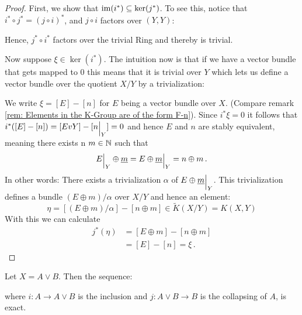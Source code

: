 \begin{proof}
	First, we show that $\mathrm{im}(i^*)\subseteq \ker(j^*)$. To see this, notice that $i^*\circ j^*=(j\circ i)^*$, and $j\circ i$ factors over $(Y,Y)$:
	\begin{center}
	\end{center} Hence, $j^*\circ i^*$ factors over the trivial Ring and thereby is trivial.
	
	Now suppose $\xi\in \ker(i^*)$. 
	The intuition now is that if we have a vector bundle that gets mapped to $0$ this means that it is trivial over $Y$ which lets us define a vector bundle over the quotient $X\slash Y$ by a trivialization: 
	
	
	We write $\xi=[E]-[n]$ for $E$ being a vector bundle over $X$. (Compare remark \ref{rem: Elements in the K-Group are of the form F-n}). Since $i^*\xi=0$ it follows that $i^*([E]-[n])=[{E}v{Y}]-[{n}\einsch{Y}]=0$ and hence $E$ and $n$ are stably equivalent, meaning there exists n $m\in \mathbb{N}$ such that
	\begin{equation*}
		{E}\einsch{Y}\oplus \underline{m}= {E\oplus \underline{m}}\einsch{Y}=n\oplus m \,.
	\end{equation*} 
	In other words: There exists a trivialization $\alpha$ of ${E\oplus \underline{m}}\einsch{Y}$. 
	This trivialization defines a bundle $(E\oplus m)\slash \alpha$ over $X\slash Y$ and hence an element: 
	\begin{equation*}
		\eta=[(E\oplus m)\slash \alpha]-[n\oplus m]\in \tilde{K}(X\slash Y)=K(X,Y)
	\end{equation*}
	With this we can calculate
	\begin{align*}
		j^*(\eta)&=[E\oplus m]-[n\oplus m]\\
		&=[E]-[n]=\xi \, .
	\end{align*}    
\end{proof}
\begin{cor}
	Let $X=A\vee B$. Then the sequence:
	\begin{center}
	\end{center}
	where $i:A\to A\vee B$ is the inclusion and $j: A\vee B\to B$ is the collapsing of $A$, is exact.
\end{cor}
